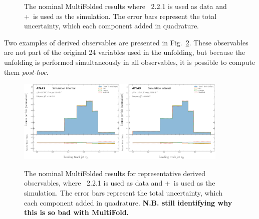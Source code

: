 \begin{figure}[h!]
\caption{The nominal MultiFolded results where \sherpa~2.2.1 is used as data and \powheg+\pythia~is used as the simulation. The error bars represent the total uncertainty, which each component added in quadrature.}
\label{fig:simresultsmulti_nominal}
\end{figure}

Two examples of derived observables are presented in Fig.~\ref{fig:simresultsmulti_nominal2}.  These observables are not part of the original 24 variables used in the unfolding, but because the unfolding is performed simultaneously in all observables, it is possible to compute them \textit{post-hoc}.

\begin{figure}[h!]
\centering
\includegraphics[width=0.45\textwidth,page=1]{figures/SimResults/DerivedObservables_Results.pdf}\includegraphics[width=0.45\textwidth,page=2]{figures/SimResults/DerivedObservables_Results.pdf}
\caption{The nominal MultiFolded results for representative derived observables, where \sherpa~2.2.1 is used as data and \powheg+\pythia~is used as the simulation. The error bars represent the total uncertainty, which each component added in quadrature.  \textbf{N.B. still identifying why this is so bad with MultiFold.}}
\label{fig:simresultsmulti_nominal2}
\end{figure}


